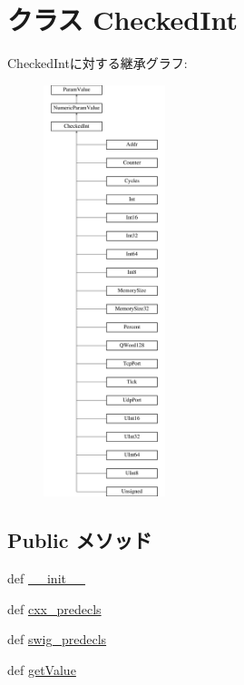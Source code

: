 \hypertarget{classm5_1_1params_1_1CheckedInt}{
\section{クラス CheckedInt}
\label{classm5_1_1params_1_1CheckedInt}
}
CheckedIntに対する継承グラフ:\begin{figure}[H]
\begin{center}
\leavevmode
\includegraphics[height=12cm]{classm5_1_1params_1_1CheckedInt}
\end{center}
\end{figure}
\subsection*{Public メソッド}
\begin{DoxyCompactItemize}
\item 
def \hyperlink{classm5_1_1params_1_1CheckedInt_ac775ee34451fdfa742b318538164070e}{\_\-\_\-init\_\-\_\-}
\item 
def \hyperlink{classm5_1_1params_1_1CheckedInt_a0b408a11a14bd1d770e28f71a6e14ab5}{cxx\_\-predecls}
\item 
def \hyperlink{classm5_1_1params_1_1CheckedInt_ab3dbcf5716623eac67a8ccc074fa7e13}{swig\_\-predecls}
\item 
def \hyperlink{classm5_1_1params_1_1CheckedInt_acc340fbd4335fa34f9d57fb454b28ed0}{getValue}
\end{DoxyCompactItemize}
